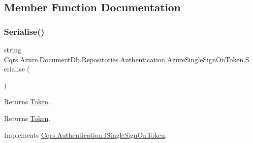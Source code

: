 \subsection{Member Function Documentation}
\mbox{\label{classCqrs_1_1Azure_1_1DocumentDb_1_1Repositories_1_1Authentication_1_1AzureSingleSignOnToken_a55c07b93600e6863985b50d4df346af0_a55c07b93600e6863985b50d4df346af0}} 
\subsubsection{\texorpdfstring{Serialise()}{Serialise()}}
{\footnotesize\ttfamily string Cqrs.\+Azure.\+Document\+Db.\+Repositories.\+Authentication.\+Azure\+Single\+Sign\+On\+Token.\+Serialise (\begin{DoxyParamCaption}{ }\end{DoxyParamCaption})}



Returns \hyperlink{classCqrs_1_1Azure_1_1DocumentDb_1_1Repositories_1_1Authentication_1_1AzureSingleSignOnToken_ad8db4fad59b85056e4e37c9e29226425_ad8db4fad59b85056e4e37c9e29226425}{Token}. 

\begin{DoxyReturn}{Returns}
\hyperlink{classCqrs_1_1Azure_1_1DocumentDb_1_1Repositories_1_1Authentication_1_1AzureSingleSignOnToken_ad8db4fad59b85056e4e37c9e29226425_ad8db4fad59b85056e4e37c9e29226425}{Token}.
\end{DoxyReturn}


Implements \hyperlink{interfaceCqrs_1_1Authentication_1_1ISingleSignOnToken_af34e8c0b052865d687064d3381bfbcdb_af34e8c0b052865d687064d3381bfbcdb}{Cqrs.\+Authentication.\+I\+Single\+Sign\+On\+Token}.



